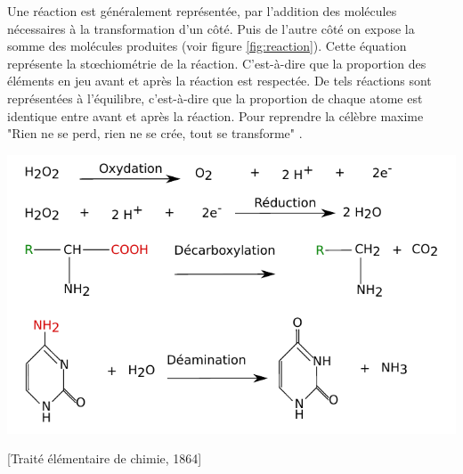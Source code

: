 \begin{refsection}
    Une réaction est généralement représentée, par l’addition des molécules nécessaires à la transformation d’un côté. Puis de l’autre côté on expose la somme des molécules produites (voir figure \ref{fig:reaction}). Cette équation  représente la stœchiométrie de la réaction. C’est-à-dire que la proportion des éléments en jeu avant et après la réaction est respectée. De tels réactions sont représentées à l'équilibre, c'est-à-dire que la proportion de chaque atome est identique entre avant et après la réaction. Pour reprendre la célèbre maxime "Rien ne se perd, rien ne se crée, tout se transforme" .
    
    \begin{shadedfigure}
        \centering
        \includegraphics[width=\textwidth]{img/equation_reaction.pdf}
        \caption{Représentation de réaction sous leur forme "équation-bilan" .}
        \label{fig:reaction}
    \end{shadedfigure}
    
    [Traité élémentaire de chimie, 1864]
    
    

\end{refsection}
